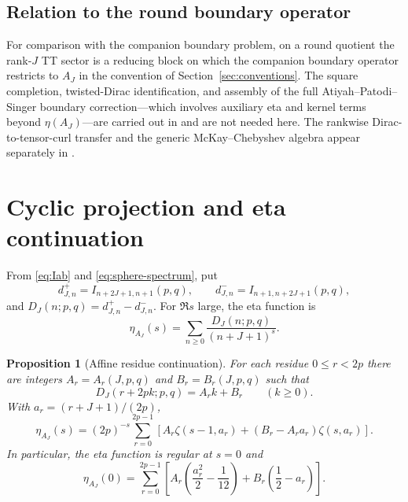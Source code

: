 \documentclass[11pt]{article}
\newtheorem{proposition}[theorem]{Proposition}
\theoremstyle{definition}
\begin{document}
\subsection{Relation to the round boundary operator}
\label{sec:round-boundary-interface}

For comparison with the companion boundary problem, on a round quotient the
rank-$J$ TT sector is a reducing block on which the companion boundary operator
restricts to $A_J$ in the convention of Section~\ref{sec:conventions}.  The
square completion, twisted-Dirac identification, and assembly of the full
Atiyah--Patodi--Singer boundary correction---which involves auxiliary eta and
kernel terms beyond $\eta(A_J)$---are carried out in
\cite{Mahmood2026SteinWeissAPSBoundary} and are not needed here.  The
rankwise Dirac-to-tensor-curl transfer and the generic McKay--Chebyshev
algebra appear separately in
\cite{Mahmood2026DiracToTensorCurlEtaTransfer,
Mahmood2026BivariateMcKay}.

\section{Cyclic projection and eta continuation}
\label{sec:continuation}

From \eqref{eq:Iab} and \eqref{eq:sphere-spectrum}, put
\begin{equation}
 d^+_{J,n}=I_{n+2J+1,n+1}(p,q),\qquad
 d^-_{J,n}=I_{n+1,n+2J+1}(p,q),
 \label{eq:branch-multiplicities}
\end{equation}
and $D_J(n;p,q)=d^+_{J,n}-d^-_{J,n}$.  For $\Re s$ large, the eta function is
\begin{equation}
 \eta_{A_J}(s)=\sum_{n\geq0}
 \frac{D_J(n;p,q)}{(n+J+1)^s}.
 \label{eq:eta-series}
\end{equation}

\begin{proposition}[Affine residue continuation]
\label{prop:eta-continuation}
For each residue $0\leq r<2p$ there are integers
$A_r=A_r(J,p,q)$ and $B_r=B_r(J,p,q)$ such that
\begin{equation}
 D_J(r+2pk;p,q)=A_rk+B_r\qquad(k\geq0).
 \label{eq:affine-residue}
\end{equation}
With $a_r=(r+J+1)/(2p)$,
\begin{equation}
 \eta_{A_J}(s)=(2p)^{-s}\sum_{r=0}^{2p-1}
 \left[A_r\zeta(s-1,a_r)+(B_r-A_ra_r)\zeta(s,a_r)\right].
 \label{eq:hurwitz-continuation}
\end{equation}
In particular, the eta function is regular at $s=0$ and
\begin{equation}
 \eta_{A_J}(0)=\sum_{r=0}^{2p-1}
 \left[A_r\left(\frac{a_r^2}{2}-\frac1{12}\right)
 +B_r\left(\frac12-a_r\right)\right].
 \label{eq:eta-zero-hurwitz}
\end{equation}
\end{proposition}
\end{document}
